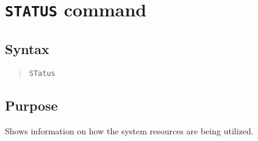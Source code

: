 \section{{\tt STATUS} command}
\subsection{Syntax}
\begin{verse}{\tt STatus}
\end{verse}
\subsection{Purpose}

Shows information on how the system resources are being utilized.
